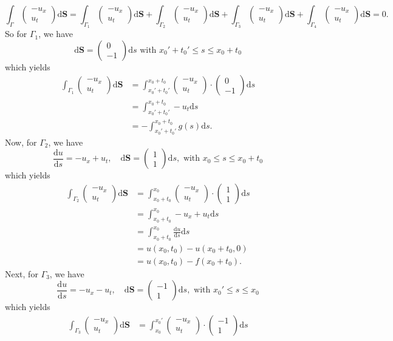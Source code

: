 \documentclass[a4paper,12pt]{article}
\newcommand{\dd}[1]{\mathrm{d}#1}
\newcommand{\pmat}[1]{\begin{pmatrix} #1 \end{pmatrix}}
\begin{document}
\begin{enumerate}[label = \arabic*.]
\begin{enumerate}[label = (\alph*)]
		\[
			\int_{\Gamma} \pmat{-u_x \\ u_t} \dd \textbf{S} = \int_{\Gamma_1} \pmat{-u_x \\ u_t} \dd \textbf{S} + 
			\int_{\Gamma_2} \pmat{-u_x \\ u_t} \dd \textbf{S} + 
			\int_{\Gamma_3} \pmat{-u_x \\ u_t} \dd \textbf{S} + 
			\int_{\Gamma_4} \pmat{-u_x \\ u_t} \dd \textbf{S} = 0.
		\]
		So for $\Gamma_1$, we have
		\[
			\dd \textbf{S} = \pmat{0 \\ -1} \dd s \text{ with } x_0' + t_0' \leq s \leq x_0 + t_0
		\]
		which yields
		\begin{align*}
			\int_{\Gamma_1} \pmat{-u_x \\ u_t} \dd \textbf{S} &= \int_{x_0' + t_0'}^{x_0 + t_0} \pmat{-u_x \\ u_t}\cdot \pmat{0 \\ -1} \dd s \\
			&= \int_{x_0' + t_0'}^{x_0 + t_0} -u_t \dd s \\
			&= -\int_{x_0' + t_0'}^{x_0 + t_0} g(s) \dd s.
		\end{align*}
		Now, for $ \Gamma_2 $, we have 
		\[
			\frac{\dd u}{\dd s} = -u_x + u_t, \quad \dd \textbf{S} = \pmat{1 \\ 1} \dd s, \text{ with } x_0 \leq s \leq x_0 + t_0
		\]
		which yields
		\begin{align*}
			\int_{\Gamma_2} \pmat{-u_x \\ u_t} \dd \textbf{S} &= \int_{x_0 + t_0}^{x_0} \pmat{-u_x \\ u_t} \cdot \pmat{1 \\ 1} \dd s \\
			&= \int_{x_0 + t_0}^{x_0} -u_x + u_t \dd s \\
			&= \int_{x_0 + t_0}^{x_0} \frac{\dd u}{\dd s} \dd s \\
			&= u(x_0, t_0) - u(x_0 + t_0, 0) \\
			&= u(x_0, t_0) - f(x_0 + t_0).
		\end{align*}
		Next, for $ \Gamma_3 $, we have
		\[
			\frac{\dd u}{\dd s} = -u_x - u_t, \quad \dd \textbf{S} = \pmat{-1 \\ 1} \dd s, \text{ with } x_0' \leq s \leq x_0
		\]
		which yields
		\begin{align*}
			\int_{\Gamma_3} \pmat{-u_x \\ u_t} \dd \textbf{S} &= \int_{x_0}^{x_0'} \pmat{-u_x \\ u_t} \cdot \pmat{-1 \\ 1} \dd s \\

\end{align*}
\end{enumerate}
\end{enumerate}
\end{document}

